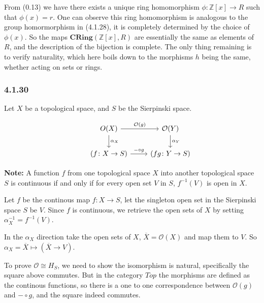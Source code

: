 \documentclass{article}
\begin{document}
From (0.13) we have there exists a unique ring homomorphism $\phi\colon \mathds{Z}[x] \rightarrow R$ such that $\phi(x) = r$. One can observe this ring homomorphism is analogous to the group homormorphism in (4.1.28), it is completely determined by the choice of $\phi(x)$. So the maps $\mathbf{CRing}(\mathds{Z}[x], R)$ are essentially the same as elements of $R$, and the description of the bijection is complete. The only thing remaining is to verify naturality, which here boils down to the morphisms $h$ being the same, whether acting on sets or rings.

\subsubsection*{4.1.30}

Let $X$ be a topological space, and $S$ be the Sierpinski space.

\begin{equation*}
\begin{tikzcd}
  & O(X) \arrow[d,"\alpha_X"] \arrow[r, "\mathcal{O}(g)"] & \mathcal{O}(Y) \arrow[d,"\alpha_Y"] \\
  & (f\colon X \rightarrow S) \arrow[r,"\mathit{-}\circ g"] & (fg\colon Y \rightarrow S)
\end{tikzcd}
\end{equation*}

\textbf{Note:} A function $f$ from one topological space $X$ into another topological space $S$ is continuous if and only if for every open set $V$ in $S$, $f^{-1}(V)$ is open in $X$.

Let $f$ be the continous map $f\colon X \rightarrow S$, let the singleton open set in the Sierpinski space $S$ be $V$. Since $f$ is continuous, we retrieve the open sets of $X$ by setting $\alpha_X^{-1} = f^{-1}(V)$.

In the $\alpha_X$ direction take the open sets of $X$, $\overline{X} = \mathcal{O}(X)$ and map them to $V$. So $\alpha_X = \overline{X} \mapsto (\overline{X} \rightarrow V)$.

To prove $\mathcal{O} \cong H_S$, we need to show the isomorphism is natural, specifically the square above commutes. But in the category $Top$ the morphisms are defined as the continous functions, so there is a one to one correspondence between $\mathcal{O}(g)$ and $\mathit{-} \circ g$, and the square indeed commutes.
\end{document}
